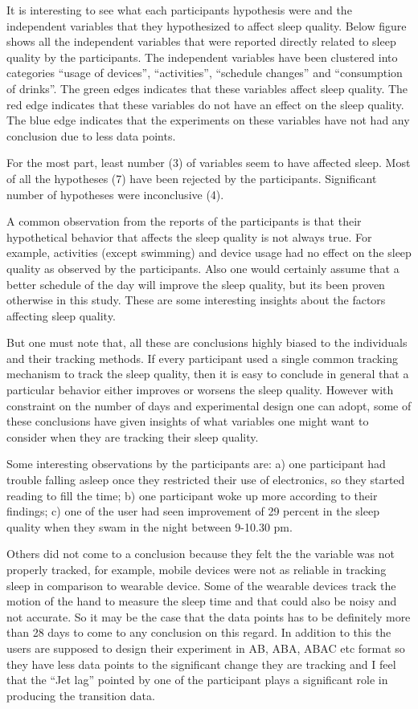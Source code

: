 It is interesting to see what each participant\textquotesingle s hypothesis were and the independent variables that they hypothesized to affect sleep quality. Below figure shows all the independent variables that were reported directly related to sleep quality by the participants. The independent variables have been clustered into categories \enquote{usage of devices}, \enquote{activities}, \enquote{schedule changes} and \enquote{consumption of drinks}. The green edges indicates that these variables affect sleep quality. The red edge indicates that these variables do not have an effect on the sleep quality. The blue edge indicates that the experiments on these variables have not had any conclusion due to less data points.

For the most part, least number (3) of variables seem to have affected sleep. Most of all the hypotheses (7) have been rejected by the participants. Significant number of hypotheses were inconclusive (4). 

A common observation from the reports of the participants is that their hypothetical behavior that affects the sleep quality is not always true. For example, activities (except swimming) and device usage had no effect on the sleep quality as observed by the participants. Also one would certainly assume that a better schedule of the day will improve the sleep quality, but its been proven otherwise in this study. These are some interesting insights about the factors affecting sleep quality. 

But one must note that, all these are conclusions highly biased to the individuals and their tracking methods. If every participant used a single common tracking mechanism to track the sleep quality, then it is easy to conclude in general that a particular behavior either improves or worsens the sleep quality. However with constraint on the number of days and experimental design one can adopt, some of these conclusions have given insights of what variables one might want to consider when they are tracking their sleep quality.

Some interesting observations by the participants are: a) one participant had trouble falling asleep once they restricted their use of electronics, so they started reading to fill the time; b) one participant woke up more according to their findings; c) one of the user had seen improvement of 29 percent in the sleep quality when they swam in the night between 9-10.30 pm. 

Others did not come to a conclusion because they felt the the variable was not properly tracked, for example, mobile devices were not as reliable in tracking sleep in comparison to wearable device. Some of the wearable devices track the motion of the hand to measure the sleep time and that could also be noisy and not accurate. So it may be the case that the data points has to be definitely more than 28 days to come to any conclusion on this regard. In addition to this the users are supposed to design their experiment in AB, ABA, ABAC etc format so they have less data points to the significant change they are tracking and I feel that the \enquote{Jet lag} pointed by one of the participant plays a significant role in producing the transition data.

